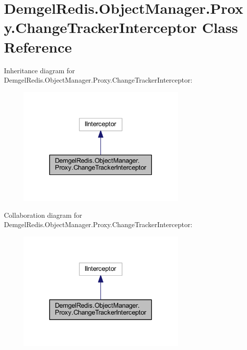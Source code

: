\hypertarget{class_demgel_redis_1_1_object_manager_1_1_proxy_1_1_change_tracker_interceptor}{}\section{Demgel\+Redis.\+Object\+Manager.\+Proxy.\+Change\+Tracker\+Interceptor Class Reference}
\label{class_demgel_redis_1_1_object_manager_1_1_proxy_1_1_change_tracker_interceptor}


Inheritance diagram for Demgel\+Redis.\+Object\+Manager.\+Proxy.\+Change\+Tracker\+Interceptor\+:
\nopagebreak
\begin{figure}[H]
\begin{center}
\leavevmode
\includegraphics[width=236pt]{class_demgel_redis_1_1_object_manager_1_1_proxy_1_1_change_tracker_interceptor__inherit__graph}
\end{center}
\end{figure}


Collaboration diagram for Demgel\+Redis.\+Object\+Manager.\+Proxy.\+Change\+Tracker\+Interceptor\+:
\nopagebreak
\begin{figure}[H]
\begin{center}
\leavevmode
\includegraphics[width=236pt]{class_demgel_redis_1_1_object_manager_1_1_proxy_1_1_change_tracker_interceptor__coll__graph}
\end{center}
\end{figure}
